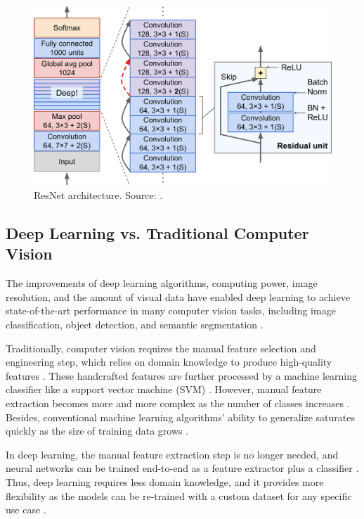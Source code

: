 \documentclass[a4paper, 11pt, oneside]{article}
\begin{document}
\begin{figure}[ht]
  \begin{center}
    \includegraphics[width=.8\textwidth]{resnet.png}
  \end{center}
  \caption{ResNet architecture. Source: \cite{geron2019hands}.}
\end{figure}

\subsection{Deep Learning vs. Traditional Computer Vision}

\label{sec:dlvscv}

The improvements of deep learning algorithms, computing power, image resolution, and the amount of visual data have
enabled deep learning to achieve state-of-the-art performance in many computer vision tasks, including image
classification, object detection, and semantic segmentation \cite{qin2015underwater, voulodimos2018deep, o2019deep}.

Traditionally, computer vision requires the manual feature selection and engineering step, which relies on domain knowledge
to produce high-quality features \cite{elgendy2020deep, zhao2019object, o2019deep}. These handcrafted features are further
processed by a machine learning classifier like a support vector machine (SVM)
\cite{elgendy2020deep, zhao2019object, o2019deep}. However, manual feature extraction becomes more and more complex as
the number of classes increases \cite{o2019deep}. Besides, conventional machine learning algorithms' ability to
generalize saturates quickly as the size of training data grows \cite{qin2015underwater}.

In deep learning, the manual feature extraction step is no longer needed, and neural networks can be trained end-to-end
as a feature extractor plus a classifier \cite{elgendy2020deep, o2019deep}. Thus, deep learning requires less domain
knowledge, and it provides more flexibility as the models can be re-trained with a custom dataset for any specific use
case \cite{o2019deep}.
\end{document}
